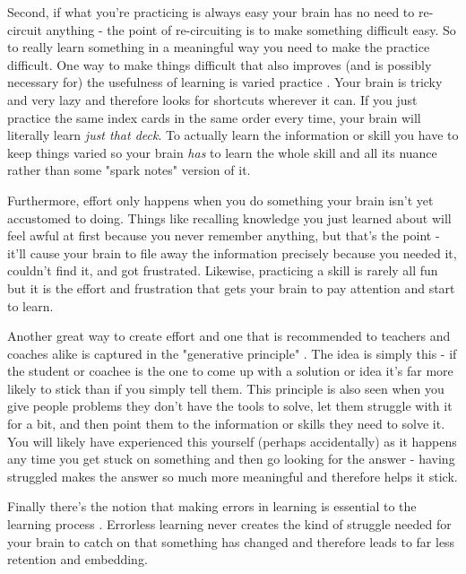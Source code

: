\documentclass[11pt,a5paper]{book}
\begin{document}
Second, if what you're practicing is always easy your brain has no need to re-circuit anything - the point of re-circuiting is to make something difficult easy. So to really learn something in a meaningful way you need to make the practice difficult. One way to make things difficult that also improves (and is possibly necessary for) the usefulness of learning is varied practice \cite{stick} \cite{ericsson}. Your brain is tricky and very lazy and therefore looks for shortcuts wherever it can. If you just practice the same index cards in the same order every time, your brain will literally learn \textit{just that deck}. To actually learn the information or skill you have to keep things varied so your brain \textit{has} to learn the whole skill and all its nuance rather than some "spark notes" version of it.
\newline

Furthermore, effort only happens when you do something your brain isn't yet accustomed to doing. Things like recalling knowledge you just learned about will feel awful at first because you never remember anything, but that's the point - it'll cause your brain to file away the information precisely because you needed it, couldn't find it, and got frustrated. Likewise, practicing a skill is rarely all fun but it is the effort and frustration that gets your brain to pay attention and start to learn. 
\newline

Another great way to create effort and one that is recommended to teachers and coaches alike is captured in the "generative principle" \cite{stick} \cite{stanier} \cite{coactive}. The idea is simply this - if the student or coachee is the one to come up with a solution or idea it's far more likely to stick than if you simply tell them. This principle is also seen when you give people problems they don't have the tools to solve, let them struggle with it for a bit, and then point them to the information or skills they need to solve it. You will likely have experienced this yourself (perhaps accidentally) as it happens any time you get stuck on something and then go looking for the answer - having struggled makes the answer so much more meaningful and therefore helps it stick.
\newline

Finally there's the notion that making errors in learning is essential to the learning process \cite{stick}. Errorless learning never creates the kind of struggle needed for your brain to catch on that something has changed and therefore leads to far less retention and embedding.
\newline
\end{document}
